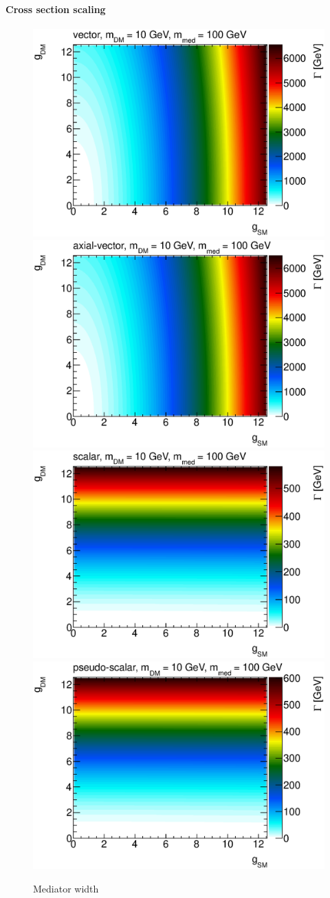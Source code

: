\paragraph{Cross section scaling}

\begin{figure}
\centering
\includegraphics[width=0.45\linewidth]{figures/monojet/constantwidth_V_gg100.eps}
\includegraphics[width=0.45\linewidth]{figures/monojet/constantwidth_A_gg100.eps}\\
\includegraphics[width=0.45\linewidth]{figures/monojet/constantwidth_S_gg100.eps}
\includegraphics[width=0.45\linewidth]{figures/monojet/constantwidth_P_gg100.eps}
\caption{Mediator width}
\label{fig:monojet_width100}
\end{figure}

